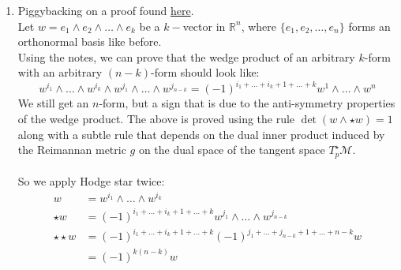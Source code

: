 \documentclass{article}
\def\cM{\mathcal{M}}
\begin{document}
\begin{enumerate}[label=(\alph*)]
    \item
    Piggybacking on a proof found \href{http://staff.ustc.edu.cn/~wangzuoq/Courses/16S-RiemGeom/Notes/Lec25.pdf}{here}.\\
    Let $w=e_1 \wedge e_2 \wedge \dots \wedge e_k$ be a $k-$vector in $\mathbb{R}^n$,
    where $\{e_1, e_2, \dots, e_n\}$ forms an orthonormal basis like before.\\
    Using the notes, we can prove that the wedge product of an 
    arbitrary $k$-form with an arbitrary $(n-k)$-form should look like:
    $$
        w^{i_1} \wedge \dots \wedge w^{i_k} \wedge w^{j_1} \wedge \dots \wedge w^{j_{n-k}} = 
        (-1)^{i_1 + \dots + i_k + 1 + \dots + k} w^{1} \wedge \dots \wedge w^{n}
    $$
    We still get an $n$-form, but a sign that is due to the anti-symmetry properties of the wedge product.
    The above is proved using the rule $\det(w \wedge \star w) = 1$
    along with a subtle rule that depends on the dual inner product induced
    by the Reimannan metric $g$ on the dual space of the tangent space $T_p^\star \cM$.\\\\
    So we apply Hodge star twice:
    \begin{align*}
        w &= w^{i_1} \wedge \dots \wedge w^{i_k} \\
        \star w &= (-1)^{i_1 + \dots + i_k + 1 + \dots + k} w^{j_1} \wedge \dots \wedge w^{j_{n-k}}\\
        \star \star w &= (-1)^{i_1 + \dots + i_k + 1 + \dots + k} (-1)^{j_1 + \dots + j_{n-k} + 1 + \dots + n-k} w\\
            &= (-1)^{k(n-k)} w
    \end{align*}
    
    

\end{enumerate}
\end{document}
